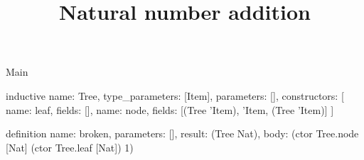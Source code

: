 \begin{lexlean}{Main}
\title{Natural number addition}
\begin{semanticmodule}
inductive{
  name: Tree,
  type_parameters: [Item],
  parameters: [],
  constructors: [
    {name: leaf, fields: []},
    {name: node, fields: [(Tree 'Item), 'Item, (Tree 'Item)]}
  ]
}

definition{
  name: broken,
  parameters: [],
  result: (Tree Nat),
  body: (ctor Tree.node [Nat] (ctor Tree.leaf [Nat]) 1)
}
\end{semanticmodule}
\end{lexlean}
